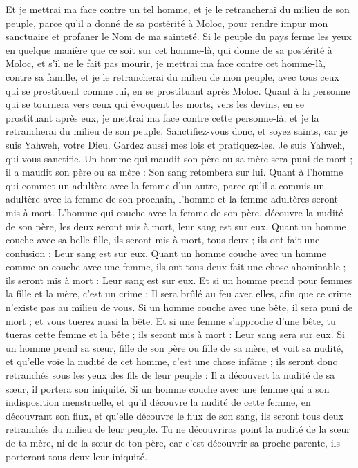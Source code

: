 \begin{multicols}{2}
Et je mettrai ma face contre un tel homme, et je le retrancherai du milieu de son peuple, parce qu'il a donné de sa postérité à Moloc, pour rendre impur mon sanctuaire et profaner le Nom de ma sainteté.
Si le peuple du pays ferme les yeux en quelque manière que ce soit sur cet homme-là, qui donne de sa postérité à Moloc, et s'il ne le fait pas mourir,
je mettrai ma face contre cet homme-là, contre sa famille, et je le retrancherai du milieu de mon peuple, avec tous ceux qui se prostituent comme lui, en se prostituant après Moloc.
Quant à la personne qui se tournera vers ceux qui évoquent les morts, vers les devins, en se prostituant après eux, je mettrai ma face contre cette personne-là, et je la retrancherai du milieu de son peuple.
Sanctifiez-vous donc, et soyez saints, car je suis Yahweh, votre Dieu.
Gardez aussi mes lois et pratiquez-les. Je suis Yahweh, qui vous sanctifie.
Un homme qui maudit son père ou sa mère sera puni de mort ; il a maudit son père ou sa mère : Son sang retombera sur lui.
Quant à l'homme qui commet un adultère avec la femme d'un autre, parce qu'il a commis un adultère avec la femme de son prochain, l'homme et la femme adultères seront mis à mort.
L'homme qui couche avec la femme de son père, découvre la nudité de son père, les deux seront mis à mort, leur sang est sur eux.
Quant un homme couche avec sa belle-fille, ils seront mis à mort, tous deux ; ils ont fait une confusion : Leur sang est sur eux.
Quant un homme couche avec un homme comme on couche avec une femme, ils ont tous deux fait une chose abominable ; ils seront mis à mort : Leur sang est sur eux.
Et si un homme prend pour femmes la fille et la mère, c'est un crime : Il sera brûlé au feu avec elles, afin que ce crime n'existe pas au milieu de vous.
Si un homme couche avec une bête, il sera puni de mort ; et vous tuerez aussi la bête.
Et si une femme s'approche d'une bête, tu tueras cette femme et la bête ; ils seront mis à mort : Leur sang sera sur eux.
Si un homme prend sa sœur, fille de son père ou fille de sa mère, et voit sa nudité, et qu'elle voie la nudité de cet homme, c'est une chose infâme ; ils seront donc retranchés sous les yeux des fils de leur peuple : Il a découvert la nudité de sa sœur, il portera son iniquité.
Si un homme couche avec une femme qui a son indisposition menstruelle, et qu'il découvre la nudité de cette femme, en découvrant son flux, et qu'elle découvre le flux de son sang, ils seront tous deux retranchés du milieu de leur peuple.
Tu ne découvriras point la nudité de la sœur de ta mère, ni de la sœur de ton père, car c'est découvrir sa proche parente, ils porteront tous deux leur iniquité.

\end{multicols}
